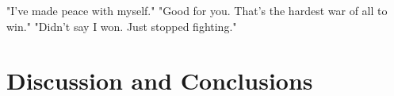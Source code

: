 \begin{savequote}[8cm]

	"I've made peace with myself."\newline
	"Good for you. That's the hardest war of all to win."\newline
	"Didn't say I won. Just stopped fighting."\newline
\end{savequote}

\chapter{Discussion and Conclusions}




